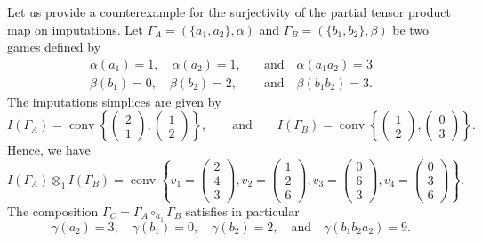 \documentclass[a4paper,12pt]{amsart}
\begin{document}
\begin{example}
    Let us provide a counterexample for the surjectivity of the partial tensor product map on imputations. Let \(\Gamma_A = (\{a_1, a_2\}, \alpha)\) and \(\Gamma_B = (\{b_1, b_2\}, \beta)\) be two games defined by 
    \[ \begin{aligned} 
    \alpha(a_1) = 1, \quad \alpha(a_2) = 1, \quad & \text{and} \quad \alpha(a_1 a_2) = 3 \\
    \beta(b_1) = 0, \quad \beta(b_2) = 2, \quad & \text{and} \quad \beta(b_1 b_2) = 3. 
    \end{aligned} \]
    The imputations simplices are given by 
    \[
    I(\Gamma_A) = \operatorname{conv} \left\{ \begin{pmatrix} 2 \\ 1 \end{pmatrix}, \begin{pmatrix} 1 \\ 2 \end{pmatrix} \right\}, \qquad \text{and} \qquad I(\Gamma_B) = \operatorname{conv} \left\{ \begin{pmatrix} 1 \\ 2 \end{pmatrix}, \begin{pmatrix} 0 \\ 3 \end{pmatrix} \right\}. 
    \]
    Hence, we have 
    \[
    I(\Gamma_A) \otimes_1 I(\Gamma_B) = \operatorname{conv} \left\{ v_1 = \begin{pmatrix} 2 \\ 4 \\ 3 \end{pmatrix}, v_2 = \begin{pmatrix} 1 \\ 2 \\ 6 \end{pmatrix}, v_3 = \begin{pmatrix} 0 \\ 6 \\ 3 \end{pmatrix}, v_4 = \begin{pmatrix} 0 \\ 3 \\ 6 \end{pmatrix} \right\}. 
    \]
    The composition \(\Gamma_C = \Gamma_A \circ_{a_1} \Gamma_B\) satisfies in particular 
    \[
    \gamma(a_2) = 3, \quad \gamma(b_1) = 0, \quad \gamma(b_2) = 2, \quad \text{and} \quad \gamma(b_1 b_2 a_2) = 9. 
    \]

\end{example}
\end{document}
